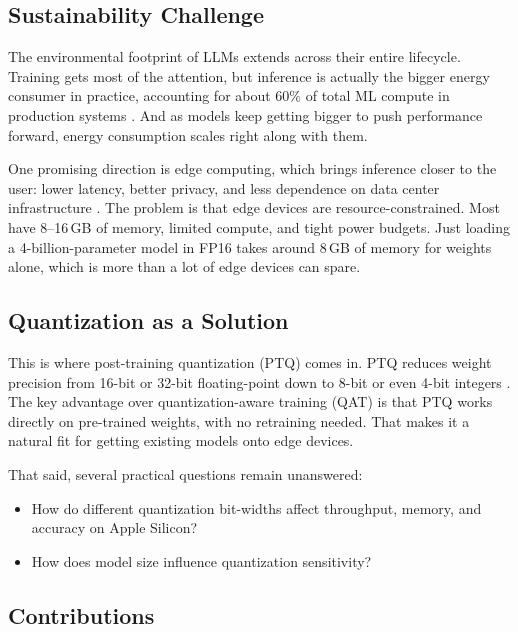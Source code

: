 \documentclass[journal]{IEEEtran}
\begin{document}
\subsection{Sustainability Challenge}

The environmental footprint of LLMs extends across their entire lifecycle. Training gets most of the attention, but inference is actually the bigger energy consumer in practice, accounting for about 60\% of total ML compute in production systems \cite{patterson2021carbon}. And as models keep getting bigger to push performance forward, energy consumption scales right along with them.

One promising direction is edge computing, which brings inference closer to the user: lower latency, better privacy, and less dependence on data center infrastructure \cite{shi2016edge}. The problem is that edge devices are resource-constrained. Most have 8--16\,GB of memory, limited compute, and tight power budgets. Just loading a 4-billion-parameter model in FP16 takes around 8\,GB of memory for weights alone, which is more than a lot of edge devices can spare.

\subsection{Quantization as a Solution}

This is where post-training quantization (PTQ) comes in. PTQ reduces weight precision from 16-bit or 32-bit floating-point down to 8-bit or even 4-bit integers \cite{han2015deep}. The key advantage over quantization-aware training (QAT) is that PTQ works directly on pre-trained weights, with no retraining needed. That makes it a natural fit for getting existing models onto edge devices.

That said, several practical questions remain unanswered:

\begin{itemize}[leftmargin=*,nosep]
    \item How do different quantization bit-widths affect throughput, memory, and accuracy on Apple Silicon?
    \item How does model size influence quantization sensitivity?
\end{itemize}

\subsection{Contributions}
\end{document}
